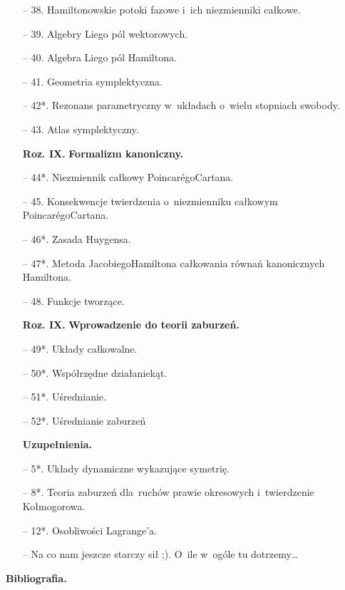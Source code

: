 \documentclass[a4paper,11pt]{article}
\begin{document}
\begin{itemize}
\item[--] 38. Hamiltonowskie potoki fazowe i~ich niezmienniki całkowe.
\item[--] 39. Algebry Liego pól wektorowych.
\item[--] 40. Algebra Liego pól Hamiltona.
\item[--] 41. Geometria symplektyczna.
\item[--] 42*. Rezonans parametryczny w~układach o~wielu stopniach swobody.
\item[--] 43. Atlas symplektyczny.
\item[\textbf{Roz. IX.}] \textbf{Formalizm kanoniczny.}
\item[--] 44*. Niezmiennik całkowy Poincar\'{e}go\dywiz Cartana.
\item[--] 45. Konsekwencje twierdzenia o~niezmienniku całkowym Poincar\'{e}go\dywiz Cartana.
\item[--] 46*. Zasada Huygensa.
\item[--] 47*. Metoda Jacobiego\dywiz Hamiltona całkowania równań kanonicznych Hamiltona.
\item[--] 48. Funkcje tworzące.
\item[\textbf{Roz. IX.}] \textbf{Wprowadzenie do teorii zaburzeń.}
\item[--] 49*. Układy całkowalne.
\item[--] 50*. Współrzędne działanie\dywiz kąt.
\item[--] 51*. Uśrednianie.
\item[--] 52*. Uśrednianie zaburzeń
\item[] \textbf{Uzupełnienia.}
\item[--] 5*. Układy dynamiczne wykazujące symetrię.
\item[--] 8*. Teoria zaburzeń dla~ruchów prawie okresowych i~twierdzenie Kołmogorowa.
\item[--] 12*. Osobliwości Lagrange'a.
\item[--] Na co nam jeszcze starczy sił ;). O~ile w~ogóle tu dotrzemy\ldots
\end{itemize}

\begin{center}
\Large{\textbf{Bibliografia.}}
\end{center}
\end{document}
